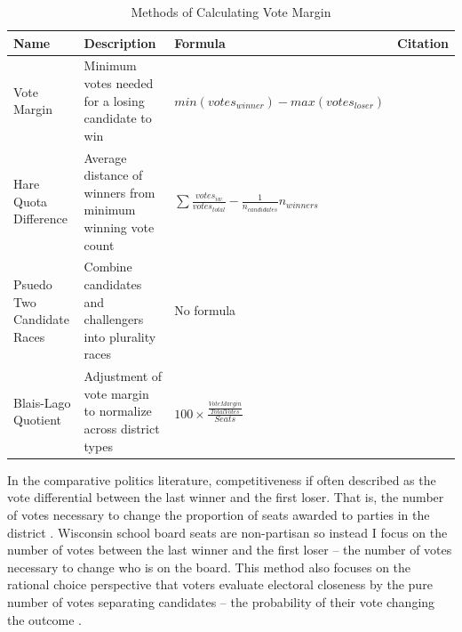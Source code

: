 \begin{table}[h!]
\begin{center}
\begin{footnotesize}
\caption{Methods of Calculating Vote Margin}
\label{tab:votemargincalc}
{\renewcommand{\arraystretch}{2}%
\begin{tabular}{| p{} | p{} | >{\centering}p{}| p{}|}
\hline
\textbf{Name}  & \textbf{Description} & \textbf{Formula} & \textbf{Citation} \\ \hline
Vote Margin  & Minimum votes needed for a losing candidate to win & $min(votes_{winner}) - max(votes_{loser})$ & \citet{VoteCalculus68,RefWorks:351,cox88} \\ \hline
Hare Quota Difference & Average distance of winners from minimum winning vote count & $\sum \frac{votes_{iw}}{votes_{total}} - \frac{1}{n_{candidates}}n_{winners}$  & \citet{Jesse1999323}   \\ \hline
Psuedo Two Candidate Races & Combine candidates and challengers into plurality races & No formula & \citet{jackmanwinsky} \\ \hline
Blais-Lago Quotient & Adjustment of vote margin to normalize across district types & $100 \times \frac{\frac{VoteMargin}{TotalVotes}}{Seats}$ & \citet{blaislago} \\ \hline
\end{tabular}}
\end{footnotesize}
\end{center}
\end{table}

In the comparative politics literature, competitiveness if often described as the 
vote differential between the last winner and the first loser. That is, the number 
of votes necessary to change the proportion of seats awarded to parties in the 
district \citep{blaislago}. Wisconsin school board seats are non-partisan so instead I focus on the 
number of votes between the last winner and the first loser -- the number of votes 
necessary to change who is on the board. This method also focuses on the rational 
choice perspective that voters evaluate electoral closeness by the pure number 
of votes separating candidates -- the probability of their vote changing the outcome 
\citep{VoteCalculus68,RefWorks:351}. 

